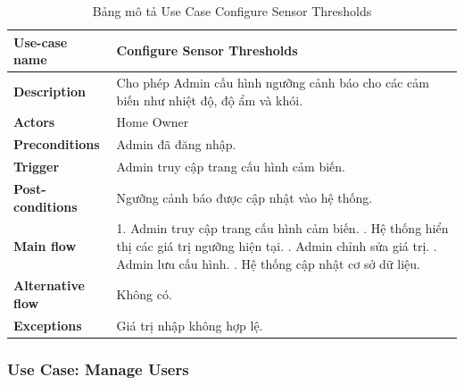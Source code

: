 \documentclass[a4paper,twoside]{article}
\begin{document}
\begin{table}[H]
\centering
\begin{tabular}{|l|p{10cm}|}
\hline
\textbf{Use-case name} & Configure Sensor Thresholds \\ \hline
\textbf{Description} & Cho phép Admin cấu hình ngưỡng cảnh báo cho các cảm biến như nhiệt độ, độ ẩm và khói. \\ \hline
\textbf{Actors} & Home Owner \\ \hline
\textbf{Preconditions} &
Admin đã đăng nhập. \\ \hline
\textbf{Trigger} &
Admin truy cập trang cấu hình cảm biến. \\ \hline
\textbf{Post-conditions} &
Ngưỡng cảnh báo được cập nhật vào hệ thống. \\ \hline
\textbf{Main flow} &
1. Admin truy cập trang cấu hình cảm biến. \newline
2. Hệ thống hiển thị các giá trị ngưỡng hiện tại. \newline
3. Admin chỉnh sửa giá trị. \newline
4. Admin lưu cấu hình. \newline
5. Hệ thống cập nhật cơ sở dữ liệu. \\ \hline
\textbf{Alternative flow} &
Không có. \\ \hline
\textbf{Exceptions} &
Giá trị nhập không hợp lệ. \\ \hline
\end{tabular}
\caption{Bảng mô tả Use Case Configure Sensor Thresholds}
\end{table}



\subsubsection{Use Case: Manage Users}
\end{document}

